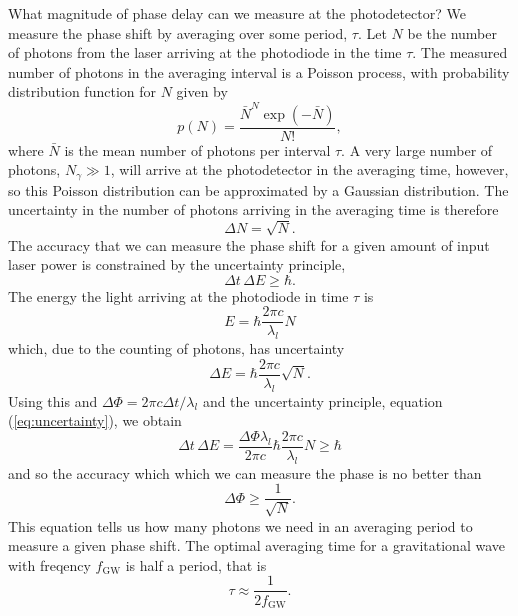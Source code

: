 What magnitude of phase delay can we measure at the photodetector? We measure
the phase shift by averaging over some period, $\tau$. Let $N$ be the number
of photons from the laser arriving at the photodiode in the time $\tau$. The
measured number of photons in the averaging interval is a Poisson process,
with probability distribution function for $N$ given by
\begin{equation}
p(N) = \frac{ \bar{N} ^{N} \exp \left(-\bar{N}\right) } {N!},
\end{equation}
where $\bar{N}$ is the mean number of photons per interval $\tau$. A very
large number of photons, $N_\gamma \gg 1$, will arrive at the photodetector in
the averaging time, however, so this Poisson distribution can be approximated
by a Gaussian distribution. The uncertainty in the number of photons arriving in the
averaging time is therefore
\begin{equation}
\Delta N = \sqrt{N}.
\end{equation}
The accuracy that we can measure the phase shift for a given amount of input
laser power is constrained by the uncertainty principle,
\begin{equation}
\Delta t \, \Delta E \ge \hbar.
\label{eq:uncertainty}
\end{equation}
The energy the light arriving at the photodiode in time $\tau$ is
\begin{equation}
E = \hbar \frac{2\pi c}{\lambda_l} N
\end{equation}
which, due to the counting of photons, has uncertainty 
\begin{equation}
\Delta E = \hbar \frac{2\pi c}{\lambda_l} \sqrt{N}.
\label{eq:uncertdeltae}
\end{equation}
Using this and $\Delta\Phi = 2\pi c \Delta t / \lambda_l$ and the uncertainty
principle, equation (\ref{eq:uncertainty}), we obtain
\begin{equation}
\Delta t \, \Delta E = \frac{\Delta \Phi \lambda_l}{2\pi c} \hbar \frac{2\pi
c}{\lambda_l} N \ge \hbar
\end{equation}
and so the accuracy which which we can measure the phase is no better than
\begin{equation}
\Delta \Phi \ge \frac{1}{\sqrt{N}}.
\end{equation}
This equation tells us how many photons we need in an averaging period to
measure a given phase shift. The optimal averaging time for a gravitational
wave with freqency $f_\mathrm{GW}$ is half a period, that is
\begin{equation}
\tau \approx \frac{1}{2 f_\mathrm{GW}}.
\end{equation}
